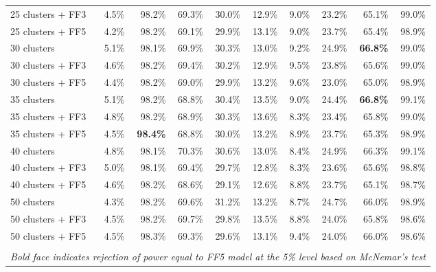 \begin{table}[!h]
\begin{center}
\begin{tabular}{lrrrrrrrrr}
25 clusters + FF3	& 4.5\% & 98.2\% & 69.3\% & 30.0\% & 12.9\% & 9.0\% & 23.2\% & 65.1\% & 99.0\% \\
25 clusters + FF5	& 4.2\% & 98.2\% & 69.1\% & 29.9\% & 13.1\% & 9.0\% & 23.7\% & 65.4\% & 98.9\% \\
30 clusters	& 5.1\% & 98.1\% & 69.9\% & 30.3\% & 13.0\% & 9.2\% & 24.9\% & \textbf{66.8\%} & 99.0\% \\
30 clusters + FF3	& 4.6\% & 98.2\% & 69.4\% & 30.2\% & 12.9\% & 9.5\% & 23.8\% & 65.6\% & 99.0\% \\
30 clusters + FF5	& 4.4\% & 98.2\% & 69.0\% & 29.9\% & 13.2\% & 9.6\% & 23.0\% & 65.0\% & 98.9\% \\
35 clusters	& 5.1\% & 98.2\% & 68.8\% & 30.4\% & 13.5\% & 9.0\% & 24.4\% & \textbf{66.8\%} & 99.1\% \\
35 clusters + FF3	& 4.8\% & 98.2\% & 68.9\% & 30.3\% & 13.6\% & 8.3\% & 23.4\% & 65.8\% & 99.0\% \\
35 clusters + FF5	& 4.5\% & \textbf{98.4\%} & 68.8\% & 30.0\% & 13.2\% & 8.9\% & 23.7\% & 65.3\% & 98.9\% \\
40 clusters	& 4.8\% & 98.1\% & 70.3\% & 30.6\% & 13.0\% & 8.4\% & 24.9\% & 66.3\% & 99.1\% \\
40 clusters + FF3	& 5.0\% & 98.1\% & 69.4\% & 29.7\% & 12.8\% & 8.3\% & 23.6\% & 65.6\% & 98.8\% \\
40 clusters + FF5	& 4.6\% & 98.2\% & 68.6\% & 29.1\% & 12.6\% & 8.8\% & 23.7\% & 65.1\% & 98.7\% \\
50 clusters	& 4.3\% & 98.2\% & 69.6\% & 31.2\% & 13.2\% & 8.7\% & 24.7\% & 66.0\% & 98.9\% \\
50 clusters + FF3	& 4.5\% & 98.2\% & 69.7\% & 29.8\% & 13.5\% & 8.8\% & 24.0\% & 65.8\% & 98.6\% \\
50 clusters + FF5	& 4.5\% & 98.3\% & 69.3\% & 29.6\% & 13.1\% & 9.4\% & 24.0\% & 66.0\% & 98.6\% \\
\hline\\
\multicolumn{10}{l}{\itshape Bold face indicates rejection of power equal to FF5 model at the 5\% level based on McNemar's test}
    \end{tabular}
    \end{center}
\end{table}

